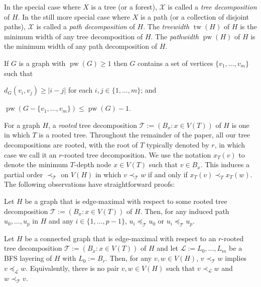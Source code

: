 \documentclass[kpfonts]{patmorin}
\DeclareMathOperator{\tw}{tw}
\DeclareMathOperator{\pw}{pw}
\theoremstyle{named}
\begin{document}
In the special case where $X$ is a tree (or a forest), $\mathcal{X}$ is called a \emph{tree decomposition} of $H$.  In the still more special case where $X$ is a path (or a collection of disjoint paths), $\mathcal{X}$ is called a \emph{path decomposition} of $H$. The \emph{treewidth} $\tw(H)$ of $H$ is the minimum width of any tree decomposition of $H$. The \emph{pathwidth} $\pw(H)$ of $H$ is the minimum width of any path decomposition of $H$.

\begin{lem}\label{pathwidth-reduction}
  If $G$ is a graph with $\pw(G)\ge 1$ then $G$ contains a set of vertices $\{v_1,\ldots,v_m\}$ such that
  \begin{inparaenum}[(i)]
    \item $d_G(v_i,v_j)\ge |i-j|$ for each $i,j\in\{1,\ldots,m\}$; and
    \item $\pw(G-\{v_1,\ldots,v_m\}) \le \pw(G)-1$.
  \end{inparaenum}
\end{lem}



For a graph $H$, a \emph{rooted} tree decomposition $\mathcal{T}:=(B_x:x\in V(T))$ of $H$ is one in which $T$ is a rooted tree.  Throughout the remainder of the paper, all our tree decompositions are rooted, with the root of $T$ typically denoted by $r$, in which case we call it an $r$-rooted tree decomposition.  We use the notation $x_T(v)$ to denote the minimum $T$-depth node $x\in V(T)$ such that $v\in B_x$.  This induces a partial order $\prec_{\mathcal{T}}$ on $V(H)$ in which $v\prec_{\mathcal{T}} w$ if and only if $x_T(v)\prec_T x_T(w)$.  The following observations have straightforward proofs:

 \begin{obs}\label{induced-unimodal}
     Let $H$ be a graph that is edge-maximal with respect to some rooted tree decomposition $\mathcal{T}:=(B_x:x\in V(T))$ of $H$.  Then, for any induced path $u_0,\ldots,u_p$ in $H$ and any $i\in\{1,\ldots,p-1\}$, $u_i\preceq_\mathcal{T} u_0$ or $u_i\preceq_\mathcal{T} u_p$.
 \end{obs}


\begin{obs}\label{order-relation}
    Let $H$ be a connected graph that is edge-maximal with respect to an $r$-rooted tree decomposition $\mathcal{T}:=(B_x:x\in V(T))$ of $H$ and let $\mathcal{L}:=L_0,\ldots,L_m$ be a BFS layering of $H$ with $L_0:=B_r$.  Then, for any $v,w\in V(H)$, $v\prec_{\mathcal{T}}w$ implies $v\preceq_{\mathcal{L}}w$. Equivalently, there is no pair $v,w\in V(H)$ such that $v\prec_{\mathcal{L}}w$ and $w\prec_{\mathcal{T}}v$.
\end{obs}
\end{document}
